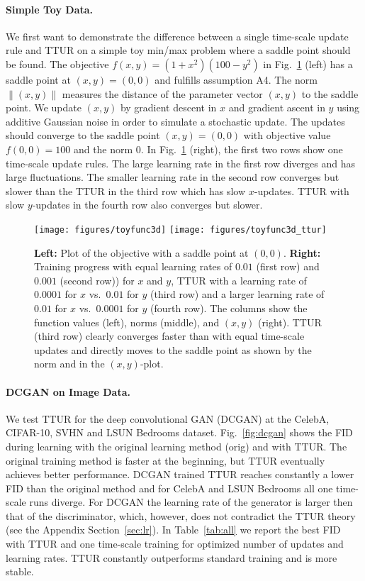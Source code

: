 \documentclass{article}
\begin{document}
\paragraph{Simple Toy Data.}

We first want to demonstrate the difference between a single time-scale
update rule and TTUR on a simple toy min/max problem where a saddle point
should be found.
The objective $f(x,y) = (1+x^2)(100-y^2)$ in Fig.~\ref{fig:toy1}
(left) has a saddle point at $(x,y) = (0,0)$ and fulfills assumption A4. The norm
$\|(x,y)\|$ measures the distance of the parameter vector $(x,y)$ to the saddle point.
We update $(x,y)$ by gradient descent in $x$ and gradient ascent in
$y$ using additive Gaussian noise in order to simulate a stochastic update.
The updates should converge to the saddle point $(x,y)=(0,0)$
with objective value $f(0,0)=100$ and the norm $0$.
In Fig.~\ref{fig:toy1} (right),
the first two rows show one time-scale update rules.
The large learning rate in the first row diverges and has large
fluctuations. The smaller
learning rate in the second row converges but slower than
the TTUR in the third row which has slow $x$-updates. TTUR with slow
$y$-updates in the fourth row also converges but slower.

 \begin{figure}[H] \centering
\texttt{[image: figures/toyfunc3d]}
\texttt{[image: figures/toyfunc3d\_ttur]}
\caption[TTUR and single time-scale update with toy data.]{{\bf Left:} Plot of
the objective with a saddle point at $(0,0)$. {\bf Right:} Training progress with equal learning rates
of $0.01$ (first row) and $0.001$ (second row)) for $x$ and $y$, TTUR with a
learning rate of $0.0001$ for $x$ vs.\ $0.01$ for $y$ (third row) and a larger
learning rate of $0.01$ for $x$ vs.\ $0.0001$ for $y$ (fourth row). The columns
show the function values (left), norms (middle), and
$(x,y)$ (right). TTUR (third row) clearly converges faster than with equal
time-scale updates and directly moves to the saddle point as shown by the norm
and in the $(x,y)$-plot.
\label{fig:toy1} }
\end{figure}

\paragraph{DCGAN on Image Data.}

We test TTUR for the deep convolutional GAN (DCGAN) \cite{Radford:15} at the
CelebA, CIFAR-10, SVHN and LSUN Bedrooms dataset. Fig.~\ref{fig:dcgan} shows
the FID during learning with the original learning method (orig) and with TTUR.
The original training method is faster at the beginning, but TTUR
eventually achieves better performance. DCGAN trained TTUR
reaches constantly a lower FID than the original method and for CelebA and LSUN
Bedrooms all one time-scale runs diverge. For DCGAN the learning rate of the
generator is larger then that of the discriminator, which, however, does not contradict
the TTUR theory (see the Appendix Section~\ref{sec:lr}). In
Table~\ref{tab:all} we report the best FID with TTUR and
one time-scale training for optimized number of updates and learning
rates. TTUR constantly outperforms standard training and is more stable.
\end{document}
